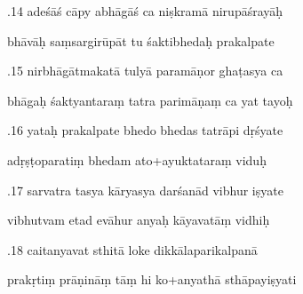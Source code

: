 \documentclass[article,12pt,a4paper]{memoir}%
\newcounter{parCount}
\begin{document}
	  
	  \pstart {}.14 adeśāś cāpy abhāgāś ca niṣkramā nirupāśrayāḥ 
	{}
	\pend%
      

	  
	  \pstart \leavevmode%
	bhāvāḥ saṃsargirūpāt tu śaktibhedaḥ prakalpate 
	{}
	\pend%
      

	  
	  \pstart {}.15 nirbhāgātmakatā tulyā paramāṇor ghaṭasya ca 
	{}
	\pend%
      

	  
	  \pstart \leavevmode%
	bhāgaḥ śaktyantaraṃ tatra parimāṇaṃ ca yat tayoḥ 
	{}
	\pend%
      

	  
	  \pstart {}.16 yataḥ prakalpate bhedo bhedas tatrāpi dṛśyate 
	{}
	\pend%
      

	  
	  \pstart \leavevmode%
	adṛṣṭoparatiṃ bhedam ato+ayuktataraṃ viduḥ 
	{}
	\pend%
      

	  
	  \pstart {}.17 sarvatra tasya kāryasya darśanād vibhur iṣyate 
	{}
	\pend%
      

	  
	  \pstart \leavevmode%
	vibhutvam etad evāhur anyaḥ kāyavatāṃ vidhiḥ 
	{}
	\pend%
      

	  
	  \pstart {}.18 caitanyavat sthitā loke dikkālaparikalpanā 
	{}
	\pend%
      

	  
	  \pstart \leavevmode%
	prakṛtiṃ prāṇināṃ tāṃ hi ko+anyathā sthāpayiṣyati 
	{}
	\pend%
      
\end{document}
